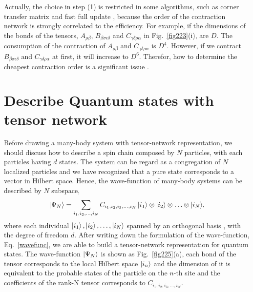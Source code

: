 Actually, the choice in step (1) is restricted in some algorithms, such as corner transfer matrix \cite{PhysRevB.85.205117} and fast full update \cite{PhysRevB.92.035142}, because the order of the contraction network is strongly correlated to the efficiency. For example, if the dimensions of the bonds of the tensors, $A_{\rho \beta}$, $B_{\beta \sigma \epsilon \delta}$ and $C_{\gamma \delta \rho \alpha}$ in Fig.~\ref{fig223}(i), are $D$. The consumption of the contraction of $A_{\rho \beta}$ and $C_{\gamma \delta \rho \alpha}$ is $D^4$. However, if we contract $B_{\beta \sigma \epsilon \delta}$ and $C_{\gamma \delta \rho \alpha}$ at first, it will increase to $D^6$. Therefor, how to determine the cheapest contraction order is a significant issue \cite{PhysRevE.90.033315}.

\section{Describe Quantum states with tensor network} %
\label{sub:map2quan}
Before drawing a many-body system with tensor-network representation, we should discuss how to describe a spin chain composed by $N$ particles, with each particles having $d$ states. The system can be regard as a congregation of $N$ localized particles and we have recognized that a pure state corresponds to a vector in Hilbert space. Hence, the wave-function of many-body systems can be described by $N$ subspace,
\begin{align}
	\Ket{\Psi_{N}} =\sum_{i_1,i_2,\ldots,i_N}{C_{i_1,i_2,i_3,\ldots,i_N}\Ket{i_1}\otimes\Ket{i_2}\otimes \ldots \otimes \Ket{i_N}},
	\label{wavefunc}
\end{align}
where each individual $\Ket{i_1}, \Ket{i_2},\ldots, \Ket{i_N}$ spanned by an orthogonal basis , with the degree of freedom $d$. After writing down the formulation of the wave-function, Eq.~\ref{wavefunc}, we are able to build a tensor-network representation for quantum states. The wave-function $\Ket{\Psi_N}$ is shown as Fig.~\ref{fig225}(a), each bond of the tensor corresponds to the local Hilbert space $\Ket{i_n}$ and the dimension of it is equivalent to the probable states of the particle on the $n$-th site and the coefficients of the rank-N tensor corresponds to $C_{i_1,i_2,i_3,\ldots,i_N}$.

